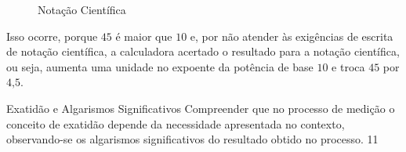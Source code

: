 \begin{figure}[H]
\begin{tikzpicture}[every node/.style={scale=1.2}]
\end{tikzpicture}
\caption{Notação Científica}
\end{figure}

Isso ocorre, porque $45$ é maior que $10$ e, por não atender às exigências de escrita de notação científica, a calculadora acertado o resultado para a notação científica, ou seja, aumenta uma unidade no expoente da potência de base $10$ e troca $45$ por $4\text{,}5$.

\cleardoublepage
\def\currentcolor{session1}
\begin{objectives}{Exatidão e Algarismos Significativos}
{
Compreender que no processo de medição o conceito de exatidão depende da necessidade apresentada no contexto, observando-se os algarismos significativos do resultado obtido no processo.
}{1}{1}
\end{objectives}
